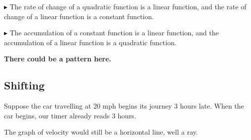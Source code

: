 \documentclass{ximera}
\begin{document}
\textbf{\textcolor{blue!55!black}{$\blacktriangleright$}} The rate of change of a quadratic function is a linear function, and the rate of change of a linear function is a constant function. 





\textbf{\textcolor{blue!55!black}{$\blacktriangleright$}} The accumulation of a constant function is a linear function, and the accumulation of a linear function is a quadratic function. 





\begin{center}
\textbf{\textcolor{purple!85!blue}{There could be a pattern here.}}
\end{center}












\subsection*{Shifting}


Suppose the car travelling at 20 mph begins its journey 3 hours late.  When the car begins, our timer already reads 3 hours.



The graph of velocity would still be a horizontal line, well a ray.



\begin{image}
\end{image}
\end{document}
